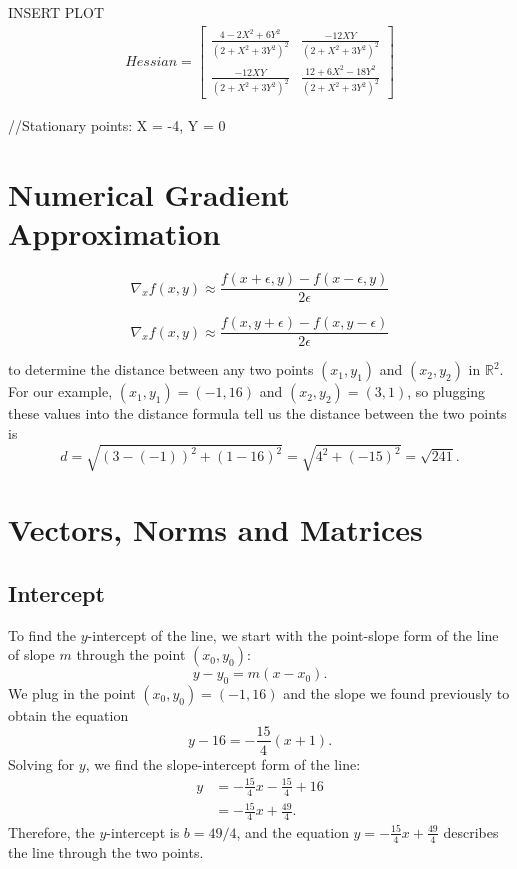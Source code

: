 \documentclass[9pt]{article}         %
\begin{document}
INSERT PLOT
\begin{gather}
Hessian = 
  \begin{bmatrix}
   \frac{4 - 2X^2 +6Y^2}{(2 + X^2 + 3Y^2)^2} &
   \frac{-12XY}{(2 + X^2 + 3Y^2)^2}\\
   \frac{-12XY}{(2 + X^2 + 3Y^2)^2} &
   \frac{12 + 6X^2 - 18Y^2}{(2 + X^2 + 3Y^2)^2} 
   \end{bmatrix}
    \nonumber
\end{gather}

//Stationary points: X = -4, Y = 0



\section{Numerical Gradient Approximation}


\begin{equation}
	\nabla_x f(x,y) \approx \dfrac{f(x + \epsilon, y) - f(x - \epsilon, y)}{2\epsilon}
\end{equation}

\begin{equation}
	\nabla_x f(x,y) \approx \dfrac{f(x, y + \epsilon) - f(x, y - \epsilon)}{2\epsilon}
\end{equation}

to determine the distance between any two points $(x_1, y_1)$ and $(x_2, y_2)$
in $\mathbb{R}^2$.  For our example, $(x_1, y_1) = (-1, 16)$ and $(x_2, y_2) =
(3, 1)$, so plugging these values into the distance formula tell us the distance between the two points is
$$
	d 
	= \sqrt{(3 - (-1))^2 + (1 - 16)^2}
	= \sqrt{4^2 + (-15)^2}
	= \sqrt{241}
	.
$$



\section{Vectors, Norms and Matrices}


\subsection{Intercept}


To find the $y$-intercept of the line, we start with the point-slope form of
the line of slope $m$ through the point $(x_0, y_0)$:
$$
	y - y_0 = m (x - x_0)
	.
$$
We plug in the point $(x_0, y_0) = (-1, 16)$ and the slope we found
previously to obtain the equation
$$
	y - 16 = - \frac{15}{4} (x + 1)
	.
$$
Solving for $y$, we find the slope-intercept form of the line:
\begin{align*}
	y 
	&= - \frac{15}{4} x - \frac{15}{4} + 16 \\
	&= - \frac{15}{4} x + \frac{49}{4}
	.
\end{align*}
Therefore, the $y$-intercept is $b = 49/4$, and the equation 
$y = - \frac{15}{4} x + \frac{49}{4}$ describes the line through the two
points.
\end{document}

